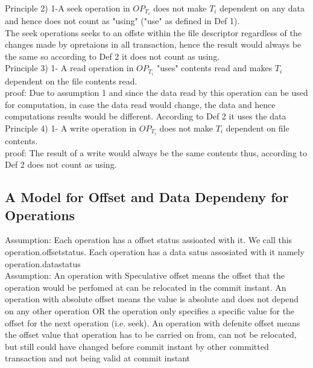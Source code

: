 \documentclass[a4paper, 11pt]{article}
\begin{document}
Principle 2) 1-A seek operation in $OP_{T_i}$ does not make $T_i$ dependent on any data and hence does not count as "using" ("use" as defined in Def 1).\\

The seek operations seeks to an offste within the file descriptor regardless of the changes made by opretaions in all transaction, hence the result would always be the same so according to Def 2 it does not count as using.\\ 

Principle 3) 1- A read operation in $OP_{T_i}$ "uses" contents read and makes $T_i$ dependent on the file contents read.\\

proof: Due to assumption 1 and since the data read by this operation can be used for computation, in case the data read would change, the data and hence computations results would be different. According to Def 2 it uses the data\\

Principle 4) 1- A write operation in $OP_{T_i}$ does not make $T_i$ dependent on file contents.\\   

proof: The result of a write would always be the same contents thus, according to Def 2 does not count as using.\\

\subsection{A Model for Offset and Data Dependeny for Operations}

Assumption: Each operation has a offset status assioated with it. We call this operation.offsetstatus. Each operation has a data satus assosiated with it namely operation.datastatus\\

Assumption:  An operation with Speculative offset means the offset that the operation would be perfomed at can be relocated in the commit instant. An operation with absolute offset means the value is absolute and does not depend on any other operation OR the operation only specifies a specific value for the offset for the next operation (i.e. seek). An operation with defenite offset means the offset value that operation has to be carried on from, can not be relocated, but still could have changed before commit instant by other committed transaction and not being valid at commit instant\\
\end{document}
